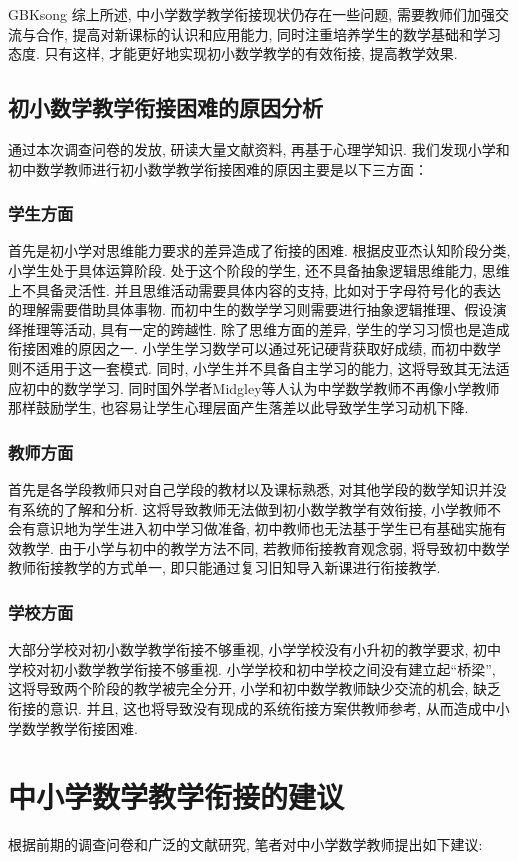 \documentclass[a4paper,12pt,twoside]{ctexart}
\begin{document}
\begin{CJK*}{GBK}{song}
综上所述, 中小学数学教学衔接现状仍存在一些问题, 需要教师们加强交流与合作, 提高对新课标的认识和应用能力, 同时注重培养学生的数学基础和学习态度. 只有这样, 才能更好地实现初小数学教学的有效衔接, 提高教学效果.
\subsection{初小数学教学衔接困难的原因分析}
通过本次调查问卷的发放, 研读大量文献资料, 再基于心理学知识. 我们发现小学和初中数学教师进行初小数学教学衔接困难的原因主要是以下三方面：
\subsubsection{学生方面}
首先是初小学对思维能力要求的差异造成了衔接的困难. 根据皮亚杰认知阶段分类, 小学生处于具体运算阶段. 处于这个阶段的学生, 还不具备抽象逻辑思维能力, 思维上不具备灵活性. 并且思维活动需要具体内容的支持, 比如对于字母符号化的表达的理解需要借助具体事物. 而初中生的数学学习则需要进行抽象逻辑推理、假设演绎推理等活动, 具有一定的跨越性. 除了思维方面的差异, 学生的学习习惯也是造成衔接困难的原因之一. 小学生学习数学可以通过死记硬背获取好成绩, 而初中数学则不适用于这一套模式. 同时, 小学生并不具备自主学习的能力, 这将导致其无法适应初中的数学学习.  同时国外学者Midgley等人认为中学数学教师不再像小学教师那样鼓励学生,  也容易让学生心理层面产生落差以此导致学生学习动机下降\cite{Mid}.
\subsubsection{教师方面}
首先是各学段教师只对自己学段的教材以及课标熟悉, 对其他学段的数学知识并没有系统的了解和分析.  这将导致教师无法做到初小数学教学有效衔接, 小学教师不会有意识地为学生进入初中学习做准备, 初中教师也无法基于学生已有基础实施有效教学. 由于小学与初中的教学方法不同,  若教师衔接教育观念弱,  将导致初中数学教师衔接教学的方式单一,  即只能通过复习旧知导入新课进行衔接教学.
\subsubsection{学校方面}
大部分学校对初小数学教学衔接不够重视, 小学学校没有小升初的教学要求, 初中学校对初小数学教学衔接不够重视. 小学学校和初中学校之间没有建立起“桥梁”, 这将导致两个阶段的教学被完全分开,  小学和初中数学教师缺少交流的机会, 缺乏衔接的意识. 并且, 这也将导致没有现成的系统衔接方案供教师参考,  从而造成中小学数学教学衔接困难.

\section{中小学数学教学衔接的建议}
根据前期的调查问卷和广泛的文献研究, 笔者对中小学数学教师提出如下建议:


\end{CJK*}
\end{document}
